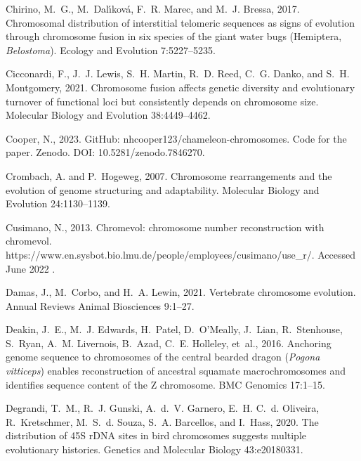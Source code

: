 \documentclass[a4paper, 12pt]{article}
\begin{document}
\begin{thebibliography}{73}
Chirino, M.~G., M.~Dal{\'\i}kov{\'a}, F.~R. Marec, and M.~J. Bressa, 2017.
\newblock Chromosomal distribution of interstitial telomeric sequences as signs
  of evolution through chromosome fusion in six species of the giant water bugs
  ({H}emiptera, \textit{Belostoma}).
\newblock Ecology and Evolution 7:5227--5235.

Cicconardi, F., J.~J. Lewis, S.~H. Martin, R.~D. Reed, C.~G. Danko, and S.~H.
  Montgomery, 2021.
\newblock Chromosome fusion affects genetic diversity and evolutionary turnover
  of functional loci but consistently depends on chromosome size.
\newblock Molecular Biology and Evolution 38:4449--4462.

Cooper, N., 2023.
\newblock GitHub: nhcooper123/chameleon-chromosomes. Code for the paper. Zenodo. DOI: 10.5281/zenodo.7846270.

Crombach, A. and P.~Hogeweg, 2007.
\newblock Chromosome rearrangements and the evolution of genome structuring and
  adaptability.
\newblock Molecular Biology and Evolution 24:1130--1139.

Cusimano, N., 2013.
\newblock Chromevol: chromosome number reconstruction with chromevol.
\newblock https://www.en.sysbot.bio.lmu.de/people/employees/cusimano/use\_r/.
  {A}ccessed {J}une 2022 .

Damas, J., M.~Corbo, and H.~A. Lewin, 2021.
\newblock Vertebrate chromosome evolution.
\newblock Annual Reviews Animal Biosciences 9:1--27.

Deakin, J.~E., M.~J. Edwards, H.~Patel, D.~O'Meally, J.~Lian, R.~Stenhouse,
  S.~Ryan, A.~M. Livernois, B.~Azad, C.~E. Holleley, et~al., 2016.
\newblock Anchoring genome sequence to chromosomes of the central bearded
  dragon (\textit{Pogona vitticeps}) enables reconstruction of ancestral
  squamate macrochromosomes and identifies sequence content of the {Z}
  chromosome.
\newblock BMC Genomics 17:1--15.

Degrandi, T.~M., R.~J. Gunski, A.~d.~V. Garnero, E.~H. C.~d. Oliveira,
  R.~Kretschmer, M.~S.~d. Souza, S.~A. Barcellos, and I.~Hass, 2020.
\newblock The distribution of 45{S} r{DNA} sites in bird chromosomes suggests
  multiple evolutionary histories.
\newblock Genetics and Molecular Biology 43:e20180331.


\end{thebibliography}
\end{document}

